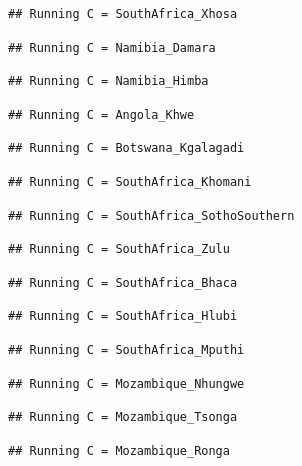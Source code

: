 \documentclass[
]{article}
\begin{document}
\begin{verbatim}
## Running C = SouthAfrica_Xhosa
\end{verbatim}

\begin{verbatim}
## Running C = Namibia_Damara
\end{verbatim}

\begin{verbatim}
## Running C = Namibia_Himba
\end{verbatim}

\begin{verbatim}
## Running C = Angola_Khwe
\end{verbatim}

\begin{verbatim}
## Running C = Botswana_Kgalagadi
\end{verbatim}

\begin{verbatim}
## Running C = SouthAfrica_Khomani
\end{verbatim}

\begin{verbatim}
## Running C = SouthAfrica_SothoSouthern
\end{verbatim}

\begin{verbatim}
## Running C = SouthAfrica_Zulu
\end{verbatim}

\begin{verbatim}
## Running C = SouthAfrica_Bhaca
\end{verbatim}

\begin{verbatim}
## Running C = SouthAfrica_Hlubi
\end{verbatim}

\begin{verbatim}
## Running C = SouthAfrica_Mputhi
\end{verbatim}

\begin{verbatim}
## Running C = Mozambique_Nhungwe
\end{verbatim}

\begin{verbatim}
## Running C = Mozambique_Tsonga
\end{verbatim}

\begin{verbatim}
## Running C = Mozambique_Ronga
\end{verbatim}
\end{document}
